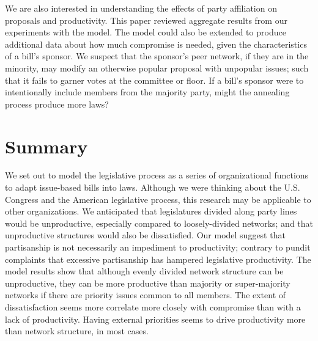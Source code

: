 \documentclass[pdftex,12pt]{llncs}
\begin{document}
We are also interested in understanding the effects of party affiliation on proposals and productivity. This paper reviewed aggregate results from our experiments with the model.
The model could also be extended to produce additional data about how much compromise is needed, given the characteristics of a bill's sponsor.
We suspect that the sponsor's peer network, if they are in the minority, may modify an otherwise popular proposal with unpopular issues; such that it fails to garner votes at the committee or floor. 
If a bill's sponsor were to intentionally include members from the majority party, might the annealing process produce more laws?

\section{Summary}
We set out to model the legislative process as a series of organizational functions to adapt issue-based bills into laws.
Although we were thinking about the U.S. Congress and the American legislative process, this research may be applicable to other organizations.
We anticipated that legislatures divided along party lines would be unproductive, especially compared to loosely-divided networks; and that unproductive structures would also be dissatisfied.
Our model suggest that partisanship is not necessarily an impediment to productivity; contrary to pundit complaints that excessive partisanship has hampered legislative productivity.
The model results show that although evenly divided network structure can be unproductive, they can be more productive than majority or super-majority networks if there are priority issues common to all members.
The extent of dissatisfaction seems more correlate more closely with compromise than with a lack of productivity. 
Having external priorities seems to drive productivity more than network structure, in most cases. 

\printbibliography
%
%

%
%
%
\end{document}
